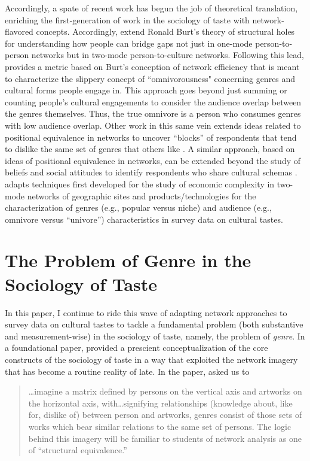 \documentclass[a4paper,12pt]{extarticle}
\begin{document}
Accordingly, a spate of recent work has begun the job of theoretical translation, enriching the first-generation of work in the sociology of taste with network-flavored concepts. Accordingly, \citet{pachucki2010cultural} extend Ronald Burt's theory of structural holes for understanding how people can bridge gaps not just in one-mode person-to-person networks but in two-mode person-to-culture networks. Following this lead, \citet{lizardo14} provides a metric based on Burt's conception of network efficiency that is meant to characterize the slippery concept of ``omnivorousness" concerning genres and cultural forms people engage in. This approach goes beyond just summing or counting people's cultural engagements to consider the audience overlap between the genres themselves. Thus, the true omnivore is a person who consumes genres with low audience overlap. Other work in this same vein extends ideas related to positional equivalence in networks \citet{breiger1976social} to uncover ``blocks'' of respondents that tend to dislike the same set of genres that others like \citep{okada2017structure}. A similar approach, based on ideas of positional equivalence in networks, can be extended beyond the study of beliefs and social attitudes to identify respondents who share cultural schemas \citep{goldberg2011mapping}. \citet{lizardo18} adapts techniques first developed for the study of economic complexity in two-mode networks of geographic sites and products/technologies for the characterization of genres (e.g., popular versus niche) and audience (e.g., omnivore versus ``univore'') characteristics in survey data on cultural tastes. 

\section{The Problem of Genre in the Sociology of Taste}
In this paper, I continue to ride this wave of adapting network approaches to survey data on cultural tastes to tackle a fundamental problem (both substantive and measurement-wise) in the sociology of taste, namely, the problem of \textit{genre}. In a foundational paper, \citet{dimaggio1987classification} provided a prescient conceptualization of the core constructs of the sociology of taste in a way that exploited the network imagery that has become a routine reality of late. In the paper, \citet[244]{dimaggio1987classification} asked us to

\begin{quote}
   {\dots}imagine a matrix defined by persons on the vertical axis and artworks on the horizontal axis, with{\dots}signifying relationships (knowledge about, like for, dislike of) between person and artworks, genres consist of those sets of works which bear similar relations to the same set of persons. The logic behind this imagery will be familiar to students of network analysis as one of ``structural equivalence.''
\end{quote}
\end{document}
